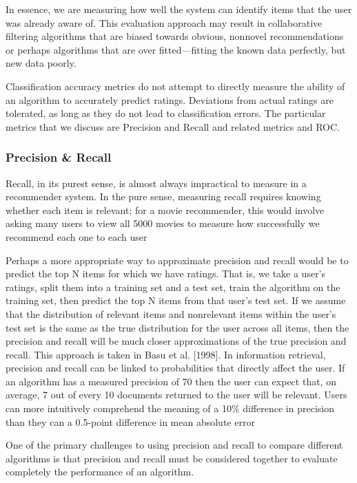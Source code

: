 In essence, we are measuring how well the system
can identify items that the user was already aware of. This evaluation approach
may result in collaborative filtering algorithms that are biased towards obvious,
nonnovel recommendations or perhaps algorithms that are over fitted—fitting
the known data perfectly, but new data poorly.

Classification accuracy metrics do not attempt to directly measure the ability
of an algorithm to accurately predict ratings. Deviations from actual ratings
are tolerated, as long as they do not lead to classification errors. The particular
metrics that we discuss are Precision and Recall and related metrics and ROC.

\subsubsection{Precision \& Recall}

Recall, in its purest sense, is almost always impractical to measure in a
recommender system. In the pure sense, measuring recall requires knowing
whether each item is relevant; for a movie recommender, this would involve
asking many users to view all 5000 movies to measure how successfully we recommend
each one to each user

Perhaps a more appropriate way to approximate precision and recall would
be to predict the top N items for which we have ratings. That is, we take a
user’s ratings, split them into a training set and a test set, train the algorithm
on the training set, then predict the top N items from that user’s test set. If we
assume that the distribution of relevant items and nonrelevant items within
the user’s test set is the same as the true distribution for the user across all
items, then the precision and recall will be much closer approximations of the
true precision and recall. This approach is taken in Basu et al. [1998].
In information retrieval, precision and recall can be linked to probabilities
that directly affect the user. If an algorithm has a measured precision of 70%
then the user can expect that, on average, 7 out of every 10 documents returned
to the user will be relevant. Users can more intuitively comprehend the meaning
of a 10\% difference in precision than they can a 0.5-point difference in mean
absolute error

One of the primary challenges to using precision and recall to compare different
algorithms is that precision and recall must be considered together to
evaluate completely the performance of an algorithm.

